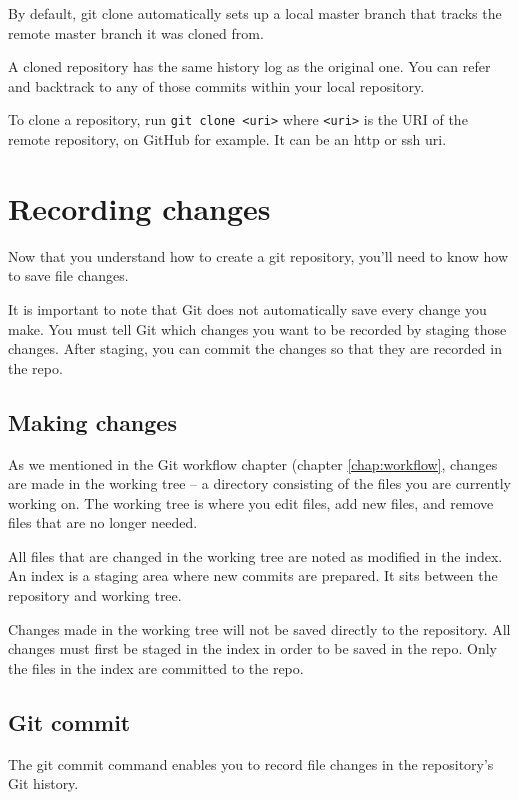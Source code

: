 \documentclass[10pt,a4paper,english]{report}
\begin{document}
    By default, git clone automatically sets up a local master branch that tracks the remote master branch it was cloned from.

    A cloned repository has the same history log as the original one. You can refer and backtrack to any of those commits within your local repository.

    To clone a repository, run \verb|git clone <uri>| where \verb|<uri>| is the URI of the remote repository, on GitHub for example. It can be an http or ssh uri.

\chapter{Recording changes}

    Now that you understand how to create a git repository, you'll need to know how to save file changes.

    It is important to note that Git does not automatically save every change you make. You must tell Git which changes you want to be recorded by staging those changes. After staging, you can commit the changes so that they are recorded in the repo.

    \section{Making changes}

    As we mentioned in the Git workflow chapter (chapter \ref{chap:workflow}, changes are made in the working tree -- a directory consisting of the files you are currently working on. The working tree is where you edit files, add new files, and remove files that are no longer needed.

    All files that are changed in the working tree are noted as modified in the index. An index is a staging area where new commits are prepared. It sits between the repository and working tree.

    Changes made in the working tree will not be saved directly to the repository. All changes must first be staged in the index in order to be saved in the repo. Only the files in the index are committed to the repo.

    \section{Git commit}

    The git commit command enables you to record file changes in the repository's Git history.
\end{document}
